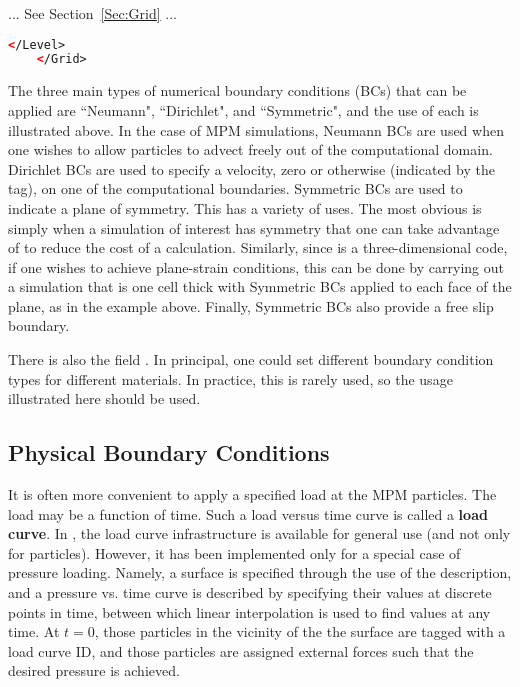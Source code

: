 ... See Section~\ref{Sec:Grid} ...

\begin{lstlisting}[language=XML]
       </Level>
    </Grid>
\end{lstlisting}

The three main types of numerical boundary conditions (BCs) that can
be applied are ``Neumann", ``Dirichlet", and ``Symmetric", and the use of
each is illustrated above.  In the case of
MPM simulations, Neumann BCs are used when one wishes to allow particles to
advect freely out of the computational domain.  Dirichlet BCs are used to
specify a velocity, zero or otherwise (indicated by the 
tag), on one of the computational boundaries.
Symmetric BCs are used to indicate a plane of symmetry.  This has a variety
of uses.  The most obvious is simply when a simulation of interest has symmetry
that one can take advantage of to reduce the cost of a calculation.  Similarly,
since \Vaango is a three-dimensional code, if one wishes to achieve plane-strain
conditions, this can be done by carrying out a simulation that is one cell thick
with Symmetric BCs applied to each face of the plane, as in the example above.
Finally, Symmetric BCs also provide a free slip boundary.

There is also the field .  In principal, one could
set different boundary condition types for different materials.  In practice,
this is rarely used, so the usage illustrated here should be used.

\subsection{Physical Boundary Conditions} \label{sec:PhysicalBCs}

It is often more convenient to apply a specified load at the MPM particles.
The load may be a function of time.  Such a load versus time curve is called
a {\bf load curve}.
In \Vaango, the load curve infrastructure is available for general use
(and not only for particles).  However, it has been implemented only for
a special case of pressure loading.  Namely, a surface is
specified through the use of the  description,
and a pressure vs. time curve is described by specifying their values
at discrete points in time, between which linear interpolation is used
to find values at any time.  At $t=0$, those particles in the vicinity
of the the surface are tagged with a load curve ID, and those particles
are assigned external forces such that the desired pressure is achieved.

